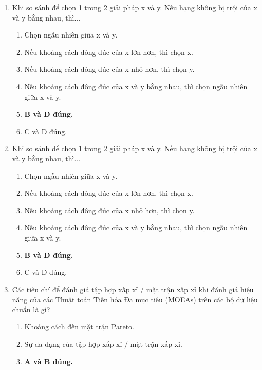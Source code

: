 \documentclass{book}
\begin{document}
\begin{enumerate}
    \item Khi so sánh để chọn 1 trong 2 giải pháp x và y. Nếu hạng không bị trội của x và y bằng nhau, thì...
    \begin{multicols}{2}
        \begin{enumerate}[label=\Alph*]
            \item Chọn ngẫu nhiên giữa x và y.
            \item Nếu khoảng cách đông đúc của x lớn hơn, thì chọn x.
            \item Nếu khoảng cách đông đúc của x nhỏ hơn, thì chọn y.
            \item Nếu khoảng cách đông đúc của x và y bằng nhau, thì chọn ngẫu nhiên giữa x và y.
            \item \textbf{B và D đúng.}
            \item C và D đúng.
        \end{enumerate}
    \end{multicols}
    \item Khi so sánh để chọn 1 trong 2 giải pháp x và y. Nếu hạng không bị trội của x và y bằng nhau, thì...
    \begin{multicols}{2}
        \begin{enumerate}[label=\Alph*]
            \item Chọn ngẫu nhiên giữa x và y.
            \item Nếu khoảng cách đông đúc của x lớn hơn, thì chọn x.
            \item Nếu khoảng cách đông đúc của x nhỏ hơn, thì chọn y.
            \item Nếu khoảng cách đông đúc của x và y bằng nhau, thì chọn ngẫu nhiên giữa x và y.
            \item \textbf{B và D đúng.}
            \item C và D đúng.
        \end{enumerate}
    \end{multicols}
    \item Các tiêu chí để đánh giá tập hợp xấp xỉ / mặt trận xấp xỉ khi đánh giá hiệu năng của các Thuật toán Tiến hóa Đa mục tiêu (MOEAs) trên các bộ dữ liệu chuẩn là gì?
    \begin{multicols}{2}
        \begin{enumerate}[label=\Alph*]
            \item Khoảng cách đến mặt trận Pareto.
            \item Sự đa dạng của tập hợp xấp xỉ / mặt trận xấp xỉ.
            \item \textbf{A và B đúng.}
        \end{enumerate}
    \end{multicols}
\end{enumerate}
\end{document}

